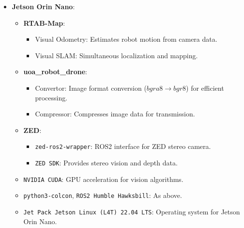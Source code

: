 \begin{itemize}
    \item \textbf{Jetson Orin Nano}:
    \begin{itemize}
        \item \textbf{RTAB-Map}:
        \begin{itemize}
            \item Visual Odometry: Estimates robot motion from camera data.
            \item Visual SLAM: Simultaneous localization and mapping.
        \end{itemize}
        \item \textbf{uoa\_robot\_drone}:
        \begin{itemize}
            \item Convertor: Image format conversion ($bgra8 \rightarrow bgr8$) for efficient processing.
            \item Compressor: Compresses image data for transmission.
        \end{itemize}
        \item \textbf{ZED}:
        \begin{itemize}
            \item \texttt{zed-ros2-wrapper}: ROS2 interface for ZED stereo camera.
            \item \texttt{ZED SDK}: Provides stereo vision and depth data.
        \end{itemize}
        \item \texttt{NVIDIA CUDA}: GPU acceleration for vision algorithms.
        \item \texttt{python3-colcon}, \texttt{ROS2 Humble Hawksbill}: As above.
        \item \texttt{Jet Pack Jetson Linux (L4T) 22.04 LTS}: Operating system for Jetson Orin Nano.
    \end{itemize}


\end{itemize}
